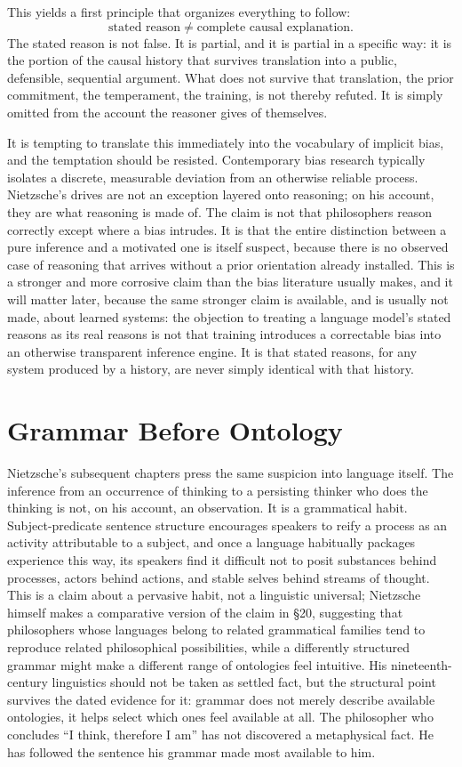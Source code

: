 \documentclass[11pt]{article}
\begin{document}
This yields a first principle that organizes everything to follow:
\[
\text{stated reason} \neq \text{complete causal explanation}.
\]
The stated reason is not false. It is partial, and it is partial in a specific way: it is the portion of the causal history that survives translation into a public, defensible, sequential argument. What does not survive that translation, the prior commitment, the temperament, the training, is not thereby refuted. It is simply omitted from the account the reasoner gives of themselves.

It is tempting to translate this immediately into the vocabulary of implicit bias, and the temptation should be resisted. Contemporary bias research typically isolates a discrete, measurable deviation from an otherwise reliable process. Nietzsche's drives are not an exception layered onto reasoning; on his account, they are what reasoning is made of. The claim is not that philosophers reason correctly except where a bias intrudes. It is that the entire distinction between a pure inference and a motivated one is itself suspect, because there is no observed case of reasoning that arrives without a prior orientation already installed. This is a stronger and more corrosive claim than the bias literature usually makes, and it will matter later, because the same stronger claim is available, and is usually not made, about learned systems: the objection to treating a language model's stated reasons as its real reasons is not that training introduces a correctable bias into an otherwise transparent inference engine. It is that stated reasons, for any system produced by a history, are never simply identical with that history.

\section{Grammar Before Ontology}

Nietzsche's subsequent chapters \cite[\S\S 16--20]{nietzsche1886} press the same suspicion into language itself. The inference from an occurrence of thinking to a persisting thinker who does the thinking is not, on his account, an observation. It is a grammatical habit. Subject-predicate sentence structure encourages speakers to reify a process as an activity attributable to a subject, and once a language habitually packages experience this way, its speakers find it difficult not to posit substances behind processes, actors behind actions, and stable selves behind streams of thought. This is a claim about a pervasive habit, not a linguistic universal; Nietzsche himself makes a comparative version of the claim in \S 20, suggesting that philosophers whose languages belong to related grammatical families tend to reproduce related philosophical possibilities, while a differently structured grammar might make a different range of ontologies feel intuitive. His nineteenth-century linguistics should not be taken as settled fact, but the structural point survives the dated evidence for it: grammar does not merely describe available ontologies, it helps select which ones feel available at all. The philosopher who concludes ``I think, therefore I am'' has not discovered a metaphysical fact. He has followed the sentence his grammar made most available to him.
\end{document}
